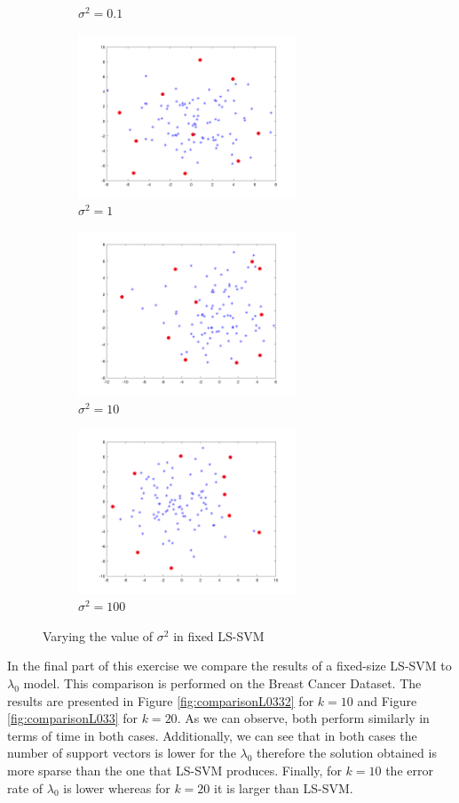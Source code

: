 \documentclass[a4paper, 11pt, one column]{article}
\begin{document}
\begin{figure}[H]
\begin{subfigure}{0.33\textwidth}
            \caption{$\sigma^2 = 0.1$}
        \end{subfigure}\hfil
		\begin{subfigure}{0.33\textwidth}
            \includegraphics[width=6.5cm]{images/fixed3.3_sigma_1.png}
            \caption{$\sigma^2 = 1$}
        \end{subfigure}\hfil
        \begin{subfigure}{0.33\textwidth}
            \includegraphics[width=6.5cm]{images/fixed3.3_sigma_10.png}
            \caption{$\sigma^2 = 10$}
        \end{subfigure}\hfil
        \begin{subfigure}{0.33\textwidth}
            \includegraphics[width=6.5cm]{images/fixed3.3_sigma_100.png}
            \caption{$\sigma^2 = 100$}
        \end{subfigure}\hfil
        \caption{Varying the value of $\sigma^2$ in fixed LS-SVM}
        \label{fig:33fixedlssvm}
\end{figure}

In the final part of this exercise we compare the results of a fixed-size LS-SVM to $\lambda_0$ model. This comparison is performed on the Breast Cancer Dataset. The results are presented in Figure \ref{fig:comparisonL0332} for $k=10$ and Figure \ref{fig:comparisonL033} for $k=20$. As we can observe, both perform similarly in terms of time in both cases. Additionally, we can see that in both cases the number of support vectors is lower for the $\lambda_0$ therefore the solution obtained is more sparse than the one that LS-SVM produces. Finally, for $k=10$ the error rate of $\lambda_0$ is lower whereas for $k=20$ it is larger than LS-SVM.
\end{document}
